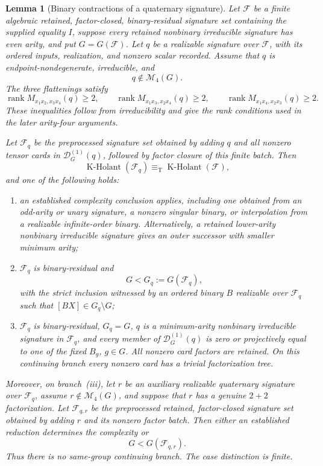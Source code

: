 \documentclass[11pt,letterpaper,onecolumn]{article}
\theoremstyle{plain}
\newtheorem{lemma}[lemma]{Lemma}
\theoremstyle{definition}
\theoremstyle{remark}
\newcommand{\cF}{\mathcal F}
\newcommand{\KHolant}{\operatorname{K\text{-}Holant}}
\newcommand{\rank}{\operatorname{rank}}
\newcommand{\equivT}{\equiv_{\mathrm T}}
\begin{document}
\begin{lemma}[Binary contractions of a quaternary signature]
\label{lem:finite-q4-dispatch}
Let \(\cF\) be a finite algebraic retained, factor-closed,
  binary-residual signature set containing the supplied equality
\(I\), suppose every retained nonbinary irreducible signature has even arity, and put
\(G=G(\cF)\).  Let \(q\) be a realizable signature over \(\cF\), with
its ordered inputs, realization, and nonzero scalar recorded.  Assume that
\(q\) is endpoint-nondegenerate, irreducible, and
\[
 q\notin\mathcal M_4(G).
\]
The three flattenings satisfy
\[
 \rank M_{x_1x_2,x_3x_4}(q)\ge2,\qquad
 \rank M_{x_1x_3,x_2x_4}(q)\ge2,\qquad
 \rank M_{x_1x_4,x_2x_3}(q)\ge2.
\]
These inequalities follow from irreducibility and give the rank
conditions used in the later arity-four arguments.

Let \(\cF_q\) be the preprocessed signature set obtained by
adding \(q\) and all nonzero tensor cards in
\(\mathscr D_G^{(1)}(q)\), followed by factor closure of this
finite batch.  Then
\[
 \KHolant(\cF_q)\equivT\KHolant(\cF),
\]
and one of the following holds:
\begin{enumerate}[label=\textnormal{(\roman*)}]
\item an established complexity conclusion applies, including one obtained from an
      odd-arity or unary signature, a nonzero singular binary, or
      interpolation from a realizable infinite-order binary. Alternatively,
      a retained lower-arity nonbinary irreducible signature gives an
      outer successor with smaller minimum arity;
\item \(\cF_q\) is binary-residual and
      \[
        G<G_q:=G(\cF_q),
      \]
      with the strict inclusion witnessed by an ordered binary \(B\) realizable
      over \(\cF_q\) such that \([BX]\in G_q\setminus G\);
\item \(\cF_q\) is binary-residual, \(G_q=G\), \(q\) is a
      minimum-arity nonbinary irreducible signature in \(\cF_q\), and every member
      of \(\mathscr D_G^{(1)}(q)\) is zero or projectively equal to one of the
      fixed \(B_g\), \(g\in G\).  All nonzero card factors are retained. On
      this continuing branch every nonzero card has a trivial factorization tree.
\end{enumerate}
Moreover, on branch~(iii), let \(r\) be an auxiliary realizable quaternary
signature over \(\cF_q\), assume \(r\notin\mathcal M_4(G)\), and suppose
that \(r\) has a genuine \(2+2\) factorization.  Let
\(\cF_{q,r}\) be the preprocessed retained, factor-closed signature set
obtained by adding \(r\) and its nonzero factor batch.  Then either
an established reduction determines the complexity or
\[
  G<G(\cF_{q,r}).
\]
Thus there is no same-group continuing branch.  The case distinction is finite.
\end{lemma}
\end{document}
